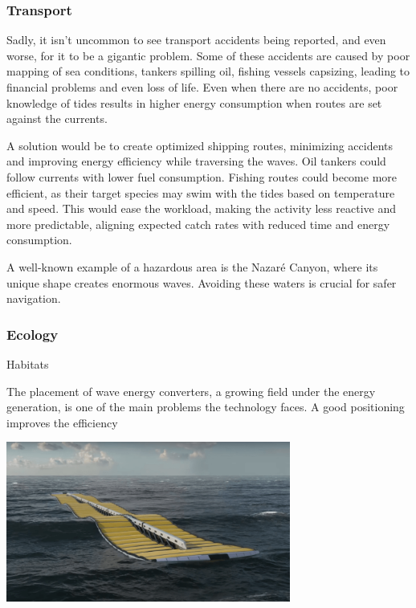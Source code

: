 \subsubsection{Transport}
Sadly, it isn't uncommon to see transport accidents being reported, and even worse, for it to be a gigantic problem.
Some of these accidents are caused by poor mapping of sea conditions, tankers spilling oil, fishing vessels capsizing, leading
to financial problems and even loss of life. Even when there are no accidents, poor knowledge of tides results in higher energy consumption when routes are set against the currents.

A solution would be to create optimized shipping routes, minimizing accidents and improving energy efficiency while 
traversing the waves. Oil tankers could follow currents with lower fuel consumption. Fishing routes could become more
efficient, as their target species may swim with the tides based on temperature and speed. This would ease the workload,
making the activity less reactive and more predictable, aligning expected catch rates with reduced time and energy 
consumption.

A well-known example of a hazardous area is the Nazaré Canyon, where its unique shape creates enormous waves. 
Avoiding these waters is crucial for safer navigation.

\subsubsection{Ecology}


Habitats 

The placement of wave energy converters, a growing field under the energy generation, is one of the main problems the
technology faces. A good positioning improves the efficiency
\begin{center}
    \includegraphics[width=0.7\textwidth]{images/chapter/introduction/renewable_energy.png}  %
    \label{fig:The Design of a Wave Energy Converter to Electricity}        
\end{center}

